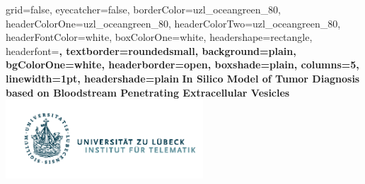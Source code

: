 \documentclass[a0paper,portrait]{baposter}
\begin{document}



\background{
}

\begin{poster}{
	grid=false,
	eyecatcher=false, 
	borderColor=uzl_oceangreen_80,
	headerColorOne=uzl_oceangreen_80,
	headerColorTwo=uzl_oceangreen_80,
	headerFontColor=white,
	boxColorOne=white,
	headershape=rectangle,
	headerfont=\large\bf,
	textborder=roundedsmall,
	background=plain,
	bgColorOne=white,
	headerborder=open,
	boxshade=plain,
	columns=5,
	linewidth=1pt,
	headershade=plain
}
{
}
{
	\vspace{0.3cm}
  \textcolor{uzl_oceangreen_80}{\textbf{In Silico Model of Tumor Diagnosis based on Bloodstream Penetrating Extracellular Vesicles}}
    \vspace{0.3cm}
}
{
  \hspace{1cm}
  \includegraphics[height=8em]{pix/Logo_Inst_Telematik_orig}
}


\end{poster}
\end{document}
